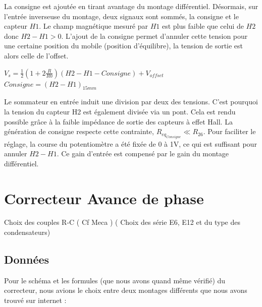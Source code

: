 \documentclass[11pt, french]{article} %
\begin{document}
La consigne est ajoutée en tirant avantage du montage différentiel. Désormais, sur l'entrée inverseuse du montage, deux signaux sont sommés, la consigne et le capteur $H1$. Le champ magnétique mesuré par $H1$ est plus faible que celui de $H2$ donc $H2-H1>0$. L'ajout de la consigne permet d'annuler cette tension pour une certaine position du mobile (position d'équilibre), la tension de sortie est alors celle de l'offset.
\begin{center}
$V_s=\frac{1}{2}(1+2 \frac{R}{R0})(H2-H1-Consigne) + V_{offset}$
$Consigne = (H2-H1)_{15mm}$
\end{center}
Le sommateur en entrée induit une division par deux des tensions. C'est pourquoi la tension du capteur H2 est également divisée via un pont. Cela est rendu possible grâce à la faible impédance de sortie des capteurs à effet Hall. La génération de consigne respecte cette contrainte, $R_{eq_{Consigne}} \ll R_{26}$. Pour faciliter le réglage, la course du potentiomètre a été fixée de 0 à 1V, ce qui est suffisant pour annuler $H2-H1$. Ce gain d'entrée est compensé par le gain du montage différentiel. 




\section{Correcteur Avance de phase}

Choix des couples R-C ( Cf Meca ) ( Choix des série E6, E12 et du type des condensateurs)



\subsection{Données}

\noindent
Pour le schéma et les formules (que nous avons quand même vérifié) du correcteur, nous avions le choix entre deux montages différents que nous avons trouvé sur internet :
\end{document}
